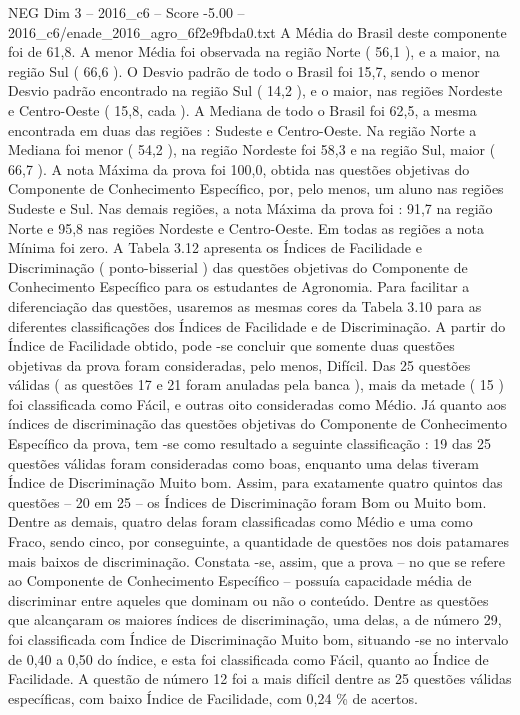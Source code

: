\begin{textsample}{NEG Dim 3 – 2016\_c6 – Score -5.00 – 2016\_c6/enade\_2016\_agro\_6f2e9fbda0.txt}
A Média do Brasil deste componente foi de 61,8.
A menor Média foi observada na região Norte ( 56,1 ), e a maior, na região Sul ( 66,6 ).
O Desvio padrão de todo o Brasil foi 15,7, sendo o menor Desvio padrão encontrado na região Sul ( 14,2 ), e o maior, nas regiões Nordeste e Centro-Oeste ( 15,8, cada ).
A Mediana de todo o Brasil foi 62,5, a mesma encontrada em duas das regiões : Sudeste e Centro-Oeste.
Na região Norte a Mediana foi menor ( 54,2 ), na região Nordeste foi 58,3 e na região Sul, maior ( 66,7 ).
A nota Máxima da prova foi 100,0, obtida nas questões objetivas do Componente de Conhecimento Específico, por, pelo menos, um aluno nas regiões Sudeste e Sul.
Nas demais regiões, a nota Máxima da prova foi : 91,7 na região Norte e 95,8 nas regiões Nordeste e Centro-Oeste.
Em todas as regiões a nota Mínima foi zero.
A Tabela 3.12 apresenta os Índices de Facilidade e Discriminação ( ponto-bisserial ) das questões objetivas do Componente de Conhecimento Específico para os estudantes de Agronomia.
Para facilitar a diferenciação das questões, usaremos as mesmas cores da Tabela 3.10 para as diferentes classificações dos Índices de Facilidade e de Discriminação.
A partir do Índice de Facilidade obtido, pode -se concluir que somente duas questões objetivas da prova foram consideradas, pelo menos, Difícil.
Das 25 questões válidas ( as questões 17 e 21 foram anuladas pela banca ), mais da metade ( 15 ) foi classificada como Fácil, e outras oito consideradas como Médio.
Já quanto aos índices de discriminação das questões objetivas do Componente de Conhecimento Específico da prova, tem -se como resultado a seguinte classificação : 19 das 25 questões válidas foram consideradas como boas, enquanto uma delas tiveram Índice de Discriminação Muito bom.
Assim, para exatamente quatro quintos das questões – 20 em 25 – os Índices de Discriminação foram Bom ou Muito bom.
Dentre as demais, quatro delas foram classificadas como Médio e uma como Fraco, sendo cinco, por conseguinte, a quantidade de questões nos dois patamares mais baixos de discriminação.
Constata -se, assim, que a prova – no que se refere ao Componente de Conhecimento Específico – possuía capacidade média de discriminar entre aqueles que dominam ou não o conteúdo.
Dentre as questões que alcançaram os maiores índices de discriminação, uma delas, a de número 29, foi classificada com Índice de Discriminação Muito bom, situando -se no intervalo de 0,40 a 0,50 do índice, e esta foi classificada como Fácil, quanto ao Índice de Facilidade.
A questão de número 12 foi a mais difícil dentre as 25 questões válidas específicas, com baixo Índice de Facilidade, com 0,24 \% de acertos.

\end{textsample}
